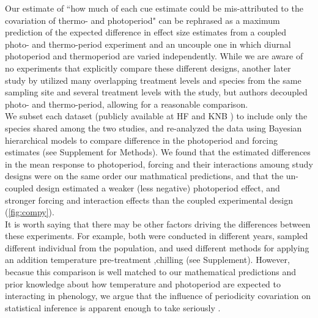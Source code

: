 \documentclass[11pt]{article}
\begin{document}
Our estimate of ``how much of each cue estimate could be mis-attributed to the covariation of thermo- and photoperiod" can be rephrased as a maximum prediction of the expected difference in effect size estimates from a coupled photo- and thermo-period experiment and an uncouple one in which diurnal photoperiod and thermoperiod are varied independently. While we are aware of no experiments that explicitly compare these different designs, another later study by \citet{Buonaiuto2020} utilized many overlapping treatment levels and species from the same sampling site and several treatment levels with the \citet{Flynn2018} study, but authors decoupled photo- and thermo-period,  allowing for a reasonable comparison.\\ 

We subset each dataset (publicly available at  HF and KNB ) to include only the  species shared among the two studies, and re-analyzed the data using Bayesian hierarchical models to compare difference in the photoperiod and forcing  estimates (see Supplement for Methods).  We found that the estimated differences in the mean response to photoperiod, forcing and their interactions amoung study designs were on the same order our mathmatical predictions, and that the un-coupled design estimated a weaker (less negative) photoperiod effect, and stronger forcing and interaction effects than the coupled experimental design (\ref{fig:compy}). \\

It is worth saying that there may be other factors driving the differences between these experiments.  For example, both were conducted in different years, sampled different individual from the population, and used different methods for applying an addition temperature pre-treatment ,chilling (see Supplement). However, becasue this comparison is well matched to our mathematical predictions and prior knowledge about how temperature and photoperiod are expected to interacting in phenology, we argue that the influence of periodicity covariation on statistical inference is apparent enough to take seriously .\\
\end{document}
